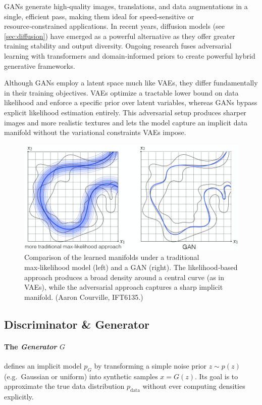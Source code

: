 \documentclass{article}
\begin{document}
GANs generate high‑quality images, translations, and data augmentations in a single, efficient pass, making them ideal for speed‑sensitive or resource‑constrained applications. In recent years, diffusion models (see \ref{sec:diffusion}) have emerged as a powerful alternative as they offer greater training stability and output diversity. Ongoing research fuses adversarial learning with transformers and domain‑informed priors to create powerful hybrid generative frameworks.

Although GANs employ a latent space much like VAEs, they differ fundamentally in their training objectives. VAEs optimize a tractable lower bound on data likelihood and enforce a specific prior over latent variables, whereas GANs bypass explicit likelihood estimation entirely. This adversarial setup produces sharper images and more realistic textures and lets the model capture an implicit data manifold without the variational constraints VAEs impose.

\begin{figure}[ht]
    \centering
    \includegraphics[width=0.75\linewidth]{graphics/S9GAN/manifold_gan.png}
    \caption{Comparison of the learned manifolds under a traditional max‑likelihood model (left) and a GAN (right). The likelihood‑based approach produces a broad density around a central curve (as in VAEs), while the adversarial approach captures a sharp implicit manifold. (Aaron Courville, IFT6135.)}
    \label{fig:manifold_gan_vs_vae}
\end{figure}

\subsection{Discriminator \& Generator}
\paragraph{The \emph{Generator} \(G\)} defines an implicit model \(p_G\) by transforming a simple noise prior \(z \sim p(z)\) (e.g.\ Gaussian or uniform) into synthetic samples \(x = G(z)\). Its goal is to approximate the true data distribution \(p_{\mathrm{data}}\) without ever computing densities explicitly.  
\end{document}
